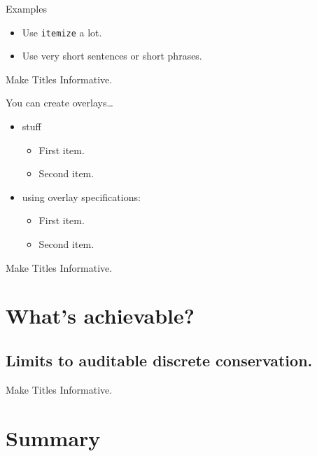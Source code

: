 \documentclass{beamer}
\begin{document}
\begin{frame}{Examples}

  \begin{itemize}
  \item
    Use \texttt{itemize} a lot.
  \item
    Use very short sentences or short phrases.
  \end{itemize}
\end{frame}


\begin{frame}{Make Titles Informative.}

  You can create overlays\dots
  \begin{itemize}
  \item stuff
    \begin{itemize}
    \item
      First item.
    \item    
      Second item.
    \end{itemize}
  \item
    using overlay specifications:
    \begin{itemize}
    \item<2->
      First item.
    \item<3->
      Second item.
    \end{itemize}
  \end{itemize}
\end{frame}


\begin{frame}{Make Titles Informative.}
\end{frame}


\section{What's achievable?}

\subsection{Limits to auditable discrete conservation.}

\begin{frame}{Make Titles Informative.}
\end{frame}


\section*{Summary}
\end{document}
